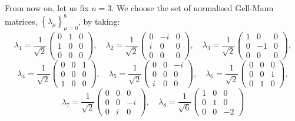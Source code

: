 \documentclass[12pt]{article}
\theoremstyle{plain}
\theoremstyle{definition}
\theoremstyle{remark}
\numberwithin{equation}{section}
\begin{document}
From now on,
let us fix $n = 3$.
We choose the set of normalised Gell-Mann matrices,
$\left \{ \lambda_{\mu} \right \}_{\mu=0}^{8}$, by taking:
\begin{equation}
\nonumber
    \lambda_{1} = \frac{1}{\sqrt{2}} \begin{pmatrix}
            0 & 1 & 0 \\
            1 & 0 & 0 \\
            0 & 0 & 0
        \end{pmatrix}, \quad
    \lambda_{2} = \frac{1}{\sqrt{2}} \begin{pmatrix}
            0 & -i & 0 \\
            i & 0 & 0 \\
            0 & 0 & 0
        \end{pmatrix}, \quad
    \lambda_{3} = \frac{1}{\sqrt{2}} \begin{pmatrix}
            1 & 0 & 0 \\
            0 & -1 & 0 \\
            0 & 0 & 0
        \end{pmatrix},
\end{equation}
\begin{equation}
\nonumber
    \lambda_{4} = \frac{1}{\sqrt{2}} \begin{pmatrix}
            0 & 0 & 1 \\
            0 & 0 & 0 \\
            1 & 0 & 0
        \end{pmatrix}, \quad
    \lambda_{5} = \frac{1}{\sqrt{2}} \begin{pmatrix}
            0 & 0 & -i \\
            0 & 0 & 0 \\
            i & 0 & 0
        \end{pmatrix}, \quad
    \lambda_{6} = \frac{1}{\sqrt{2}} \begin{pmatrix}
            0 & 0 & 0 \\
            0 & 0 & 1 \\
            0 & 1 & 0
        \end{pmatrix},
\end{equation}
\begin{equation}
\nonumber
    \lambda_{7} = \frac{1}{\sqrt{2}} \begin{pmatrix}
            0 & 0 & 0 \\
            0 & 0 & -i \\
            0 & i & 0
        \end{pmatrix}, \quad
    \lambda_{8} = \frac{1}{\sqrt{6}} \begin{pmatrix}
            1 & 0 & 0 \\
            0 & 1 & 0 \\
            0 & 0 & -2
        \end{pmatrix}
\end{equation}
\end{document}
